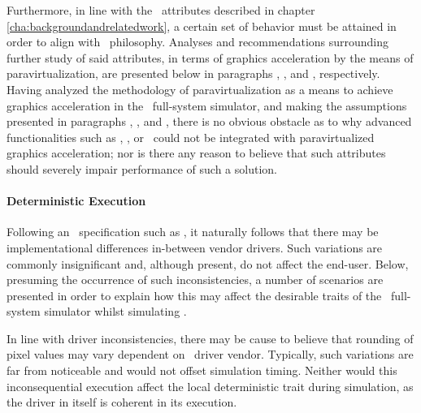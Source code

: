 Furthermore, in line with the \dvttermsimics\ attributes described in chapter \ref{cha:backgroundandrelatedwork}, a certain set of behavior must be attained in order to align with \dvttermsimics\ philosophy.
Analyses and recommendations surrounding further study of said attributes, in terms of graphics acceleration by the means of paravirtualization, are presented below in paragraphs , , and , respectively.\\

\noindent
Having analyzed the methodology of paravirtualization as a means to achieve graphics acceleration in the \dvttermsimics\ full-system simulator, and making the assumptions presented in paragraphs , , and , there is no obvious obstacle as to why advanced functionalities such as \dvttermdeterministicexecution , \dvttermcheckpointing , or \dvttermreverseexecution\ could not be integrated with paravirtualized graphics acceleration; nor is there any reason to believe that such attributes should severely impair performance of such a solution.

\paragraph{Deterministic Execution}
\label{par:discussion_deterministicexecution}
Following an \dvttermapi\ specification such as \dvttermopengles , it naturally follows that there may be implementational differences in-between vendor drivers.
Such variations are commonly insignificant and, although present, do not affect the end-user.
Below, presuming the occurrence of such inconsistencies, a number of scenarios are presented in order to explain how this may affect the desirable traits of the \dvttermsimics\ full-system simulator whilst simulating \dvttermopengles .

In line with driver inconsistencies, there may be cause to believe that rounding of pixel values may vary dependent on \dvttermhost\ driver vendor.
Typically, such variations are far from noticeable and would not offset simulation timing.
Neither would this inconsequential execution affect the local deterministic trait during simulation, as the driver in itself is coherent in its execution.

